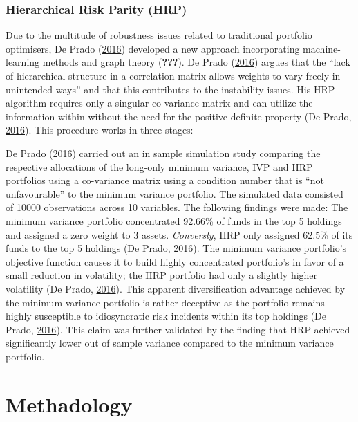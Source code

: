 \documentclass[11pt,preprint, authoryear]{elsarticle}
\numberwithin{equation}{section}
\numberwithin{figure}{section}
\numberwithin{table}{section}
\begin{document}
\hypertarget{hierarchical-risk-parity-hrp}{%
\subsubsection{Hierarchical Risk Parity
(HRP)}\label{hierarchical-risk-parity-hrp}}

Due to the multitude of robustness issues related to traditional
portfolio optimisers, De Prado (\protect\hyperlink{ref-lopez}{2016})
developed a new approach incorporating machine-learning methods and
graph theory ({\textbf{???}}). De Prado
(\protect\hyperlink{ref-lopez}{2016}) argues that the ``lack of
hierarchical structure in a correlation matrix allows weights to vary
freely in unintended ways'' and that this contributes to the instability
issues. His HRP algorithm requires only a singular co-variance matrix
and can utilize the information within without the need for the positive
definite property (De Prado, \protect\hyperlink{ref-lopez}{2016}). This
procedure works in three stages:

De Prado (\protect\hyperlink{ref-lopez}{2016}) carried out an in sample
simulation study comparing the respective allocations of the long-only
minimum variance, IVP and HRP portfolios using a co-variance matrix
using a condition number that is ``not unfavourable'' to the minimum
variance portfolio. The simulated data consisted of 10000 observations
across 10 variables. The following findings were made: The minimum
variance portfolio concentrated 92.66\% of funds in the top 5 holdings
and assigned a zero weight to 3 assets. \emph{Conversly}, HRP only
assigned 62.5\% of its funds to the top 5 holdings (De Prado,
\protect\hyperlink{ref-lopez}{2016}). The minimum variance portfolio's
objective function causes it to build highly concentrated portfolio's in
favor of a small reduction in volatility; the HRP portfolio had only a
slightly higher volatility (De Prado,
\protect\hyperlink{ref-lopez}{2016}). This apparent diversification
advantage achieved by the minimum variance portfolio is rather deceptive
as the portfolio remains highly susceptible to idiosyncratic risk
incidents within its top holdings (De Prado,
\protect\hyperlink{ref-lopez}{2016}). This claim was further validated
by the finding that HRP achieved significantly lower out of sample
variance compared to the minimum variance portfolio.

\hypertarget{methadology}{%
\section{Methadology}\label{methadology}}
\end{document}
